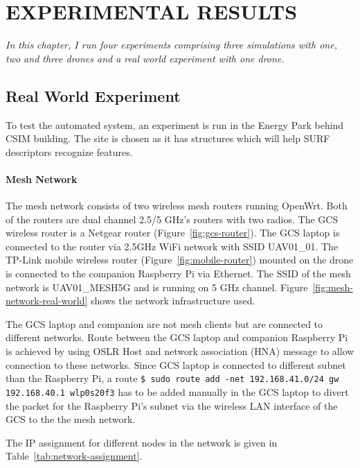 \setlength{\parindent}{0.5in} 
\setlength{\parskip}{0mm}
\setlength{\baselineskip}{1.6em}

\chapter{EXPERIMENTAL RESULTS}
\label{ch:results}
\textit{In this chapter, I run four experiments comprising three simulations with one, two and three drones and a real world experiment with one drone.  }

\section{Real World Experiment}
To test the automated system, an experiment is run in the Energy Park behind CSIM building. The site is chosen as it has structures which will help SURF descriptors recognize features. 
\subsubsection{Mesh Network}

The mesh network consists of two wireless mesh routers running OpenWrt. Both of the routers are dual channel 2.5/5 GHz's routers with two radios. The GCS wireless router is a Netgear router (Figure~\ref{fig:gcs-router}). The GCS laptop is connected to the router via 2.5GHz WiFi network with SSID UAV01\_01. The TP-Link mobile wireless router (Figure~\ref{fig:mobile-router}) mounted on the drone is connected to the companion Raspberry Pi via Ethernet. The SSID of the mesh network is UAV01\_MESH5G and is running on 5 GHz channel. Figure~\ref{fig:mesh-network-real-world} shows the network infrastructure used.

The GCS laptop and companion are not mesh clients but are connected to different networks. Route between the GCS laptop and companion Raspberry Pi is achieved by using OSLR Host and network association (HNA) message to allow connection to these networks. Since GCS laptop is connected to different subnet than the Raspberry Pi, a route \texttt{\$ sudo route add -net 192.168.41.0/24 gw 192.168.40.1 wlp0s20f3} has to be added manually in the GCS laptop to divert the packet for the Raspberry Pi's subnet via the wireless LAN interface of the GCS to the the mesh network.

The IP assignment for different nodes in the network is given in Table~\ref{tab:network-assignment}.


